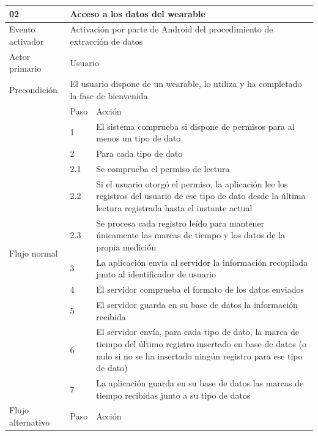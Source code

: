     \begin{table}[h]
        \centering
        \begin{tabularx}{\textwidth}{|l|l|X|}
            \hline
            02 & \multicolumn{2}{|X|}{Acceso a los datos del \gls{wearable}} \\
            \hline
            Evento activador & \multicolumn{2}{|X|}{Activación por parte de Android del procedimiento de extracción de datos} \\
            \hline
            Actor primario & \multicolumn{2}{|X|}{Usuario} \\
            \hline
            Precondición & \multicolumn{2}{|X|}{El usuario dispone de un \gls{wearable}, lo utiliza  y ha completado la fase de bienvenida} \\
            \hline
            \multirow{11}{*}{Flujo normal} & Paso & Acción \\
            \cline{2-3} & 1 & El sistema comprueba si dispone de permisos para al menos un tipo de dato \\
            \cline{2-3} & 2 & Para cada tipo de dato \\
            \cline{2-3} & 2.1 & Se comprueba el permiso de lectura \\
            \cline{2-3} & 2.2 & Si el usuario otorgó el permiso, la aplicación lee los registros del usuario de ese tipo de dato desde la última lectura registrada hasta el instante actual \\
            \cline{2-3} & 2.3 & Se procesa cada registro leído para mantener únicamente las marcas de tiempo y los datos de la propia medición \\
            \cline{2-3} & 3 & La aplicación envía al servidor la información recopilada junto al identificador de usuario \\
            \cline{2-3} & 4 & El servidor comprueba el formato de los datos enviados  \\
            \cline{2-3} & 5 & El servidor guarda en su base de datos la información recibida \\
            \cline{2-3} & 6 & El servidor envía, para cada tipo de dato, la marca de tiempo del último registro insertado en base de datos (o nulo si no se ha insertado ningún registro para ese tipo de dato) \\
            \cline{2-3} & 7 & La aplicación guarda en su base de datos las marcas de tiempo recibidas junto a su tipo de datos \\     
            \hline
            \multirow{2}{*}{Flujo alternativo} & Paso & Acción \\

\end{tabularx}
\end{table}
